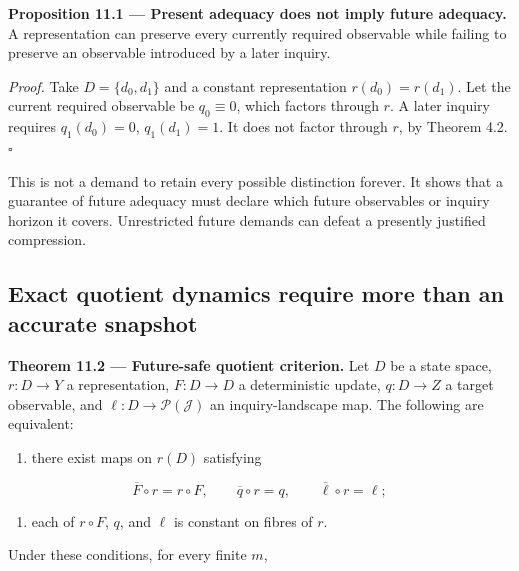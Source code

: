 \documentclass[11pt,a4paper]{article}
\providecommand{\tightlist}{\setlength{\itemsep}{0pt}\setlength{\parskip}{0pt}}
\begin{document}

\textbf{Proposition 11.1 --- Present adequacy does not imply future
adequacy.} A representation can preserve every currently required
observable while failing to preserve an observable introduced by a later
inquiry.

\emph{Proof.} Take \(D=\{d_0,d_1\}\) and a constant representation
\(r(d_0)=r(d_1)\). Let the current required observable be
\(q_0\equiv0\), which factors through \(r\). A later inquiry requires
\(q_1(d_0)=0\), \(q_1(d_1)=1\). It does not factor through \(r\), by
Theorem 4.2. \(\square\)

This is not a demand to retain every possible distinction forever. It
shows that a guarantee of future adequacy must declare which future
observables or inquiry horizon it covers. Unrestricted future demands
can defeat a presently justified compression.

\subsection{Exact quotient dynamics require more than an accurate
snapshot}\label{exact-quotient-dynamics-require-more-than-an-accurate-snapshot}


\textbf{Theorem 11.2 --- Future-safe quotient criterion.} Let \(D\) be a
state space, \(r:D\to Y\) a representation, \(F:D\to D\) a deterministic
update, \(q:D\to Z\) a target observable, and
\(\ell:D\to\mathcal P(\mathscr J)\) an inquiry-landscape map. The
following are equivalent:

\begin{enumerate}
\def\labelenumi{(\alph{enumi})}
\tightlist
\item
  there exist maps on \(r(D)\) satisfying
\end{enumerate}

\[
\overline F\circ r=r\circ F,\qquad
\overline q\circ r=q,\qquad
\overline\ell\circ r=\ell;
\]

\begin{enumerate}
\def\labelenumi{(\alph{enumi})}
\setcounter{enumi}{1}
\tightlist
\item
  each of \(r\circ F\), \(q\), and \(\ell\) is constant on fibres of
  \(r\).
\end{enumerate}

Under these conditions, for every finite \(m\),

\nopagebreak[4]
\end{document}
